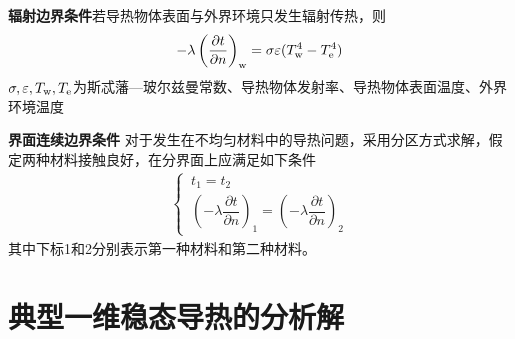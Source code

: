 \textbf{辐射边界条件}\quad 若导热物体表面与外界环境只发生辐射传热，则
\begin{align}
	- \lambda \left(\dfrac{\partial t}{\partial n}\right)_{\text{w}} = \sigma \varepsilon (T_{\text{w}}^4 - T_{{\rm{e}}}^4)
\end{align}
\hspace*{7em} $\sigma, \varepsilon, T_{\text{w}}, T_{\rm{e}}$为斯忒藩—玻尔兹曼常数、导热物体发射率、导热物体表面温度、外界环境温度
\vspace*{1em}

\noindent \textbf{界面连续边界条件} \quad 对于发生在不均匀材料中的导热问题，采用分区方式求解，假定两种材料接触良好，在分界面上应满足如下条件
\begin{align}
	\begin{cases}
		\, t_{1} = t_2\\[0.5em]
		\, \left(- \lambda \dfrac{\partial t}{\partial n}\right)_1 = \left(- \lambda \dfrac{\partial t}{\partial n}\right)_2
	\end{cases}
\end{align}
\hspace*{8em} 其中下标1和2分别表示第一种材料和第二种材料。

\section{典型一维稳态导热的分析解}
